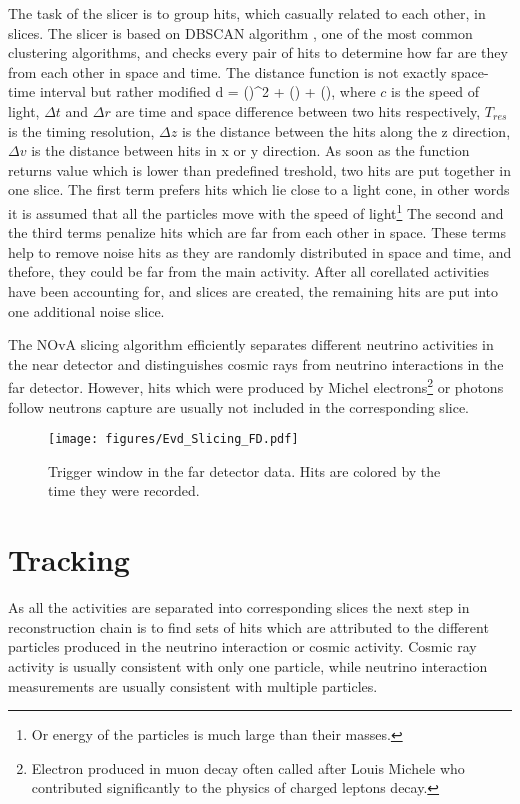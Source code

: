 The task of the slicer is to group hits, which casually related to each other, in slices. The slicer 
is based on DBSCAN algorithm \cite{DBSCAN}, one of the most common clustering algorithms, and checks 
every pair of hits to determine how far are they from each other in space and time. The distance 
function is not exactly space-time interval but rather modified 
\be
d = \Big(\Big)^2 + \Big(\Big) + 
\Big(\Big),
\ee 
where $c$ is the speed of light, $\Delta t$ and $\Delta r$ are time and space difference between two 
hits respectively, $T_{res}$ is the timing resolution, $\Delta z$ is the distance between the hits
along the z direction, $\Delta v$ is the distance between hits in x or y direction. As soon as the 
function returns value which is lower than predefined treshold, two hits are put together in one slice.
The first term prefers hits which lie close to a light cone, in other words it is assumed that all
the particles move with the speed of light\footnote{Or energy of the particles is much large than their 
masses.} The second and the third terms penalize hits which are far from each other in space. These
terms help to remove noise hits as they are randomly distributed in space and time, and thefore, they 
could be far from the main activity. After all corellated activities have been accounting for, and 
slices are created, the remaining hits are put into one additional noise slice.

The NOvA slicing algorithm efficiently separates different neutrino activities in the near detector
and distinguishes cosmic rays from neutrino interactions in the far detector. However, hits which were produced
by Michel electrons\footnote{Electron produced in muon decay often called after Louis Michele who
contributed significantly to the physics of charged leptons decay.} or photons follow neutrons capture are
usually not included in the corresponding slice.
\begin{figure}[t]
\texttt{[image: figures/Evd\_Slicing\_FD.pdf]}
\centering
\caption{Trigger window in the far detector data. Hits are colored by the time they were recorded.} 
\label{fig:EVD_full}
\end{figure}

\section{Tracking}
As all the activities are separated into corresponding slices the next step in reconstruction chain is 
to find sets of hits which are attributed to the different particles produced in the neutrino interaction 
or cosmic activity. Cosmic ray activity is usually consistent with only one particle, while neutrino 
interaction measurements are usually consistent with multiple particles.

